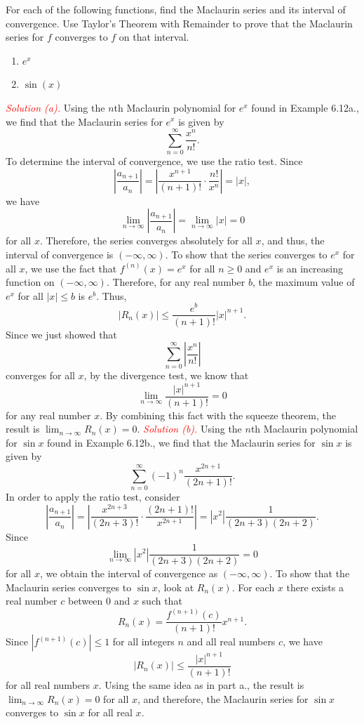 \documentclass{report}
\begin{document}
    \bigbreak \noindent 
    \begin{exm}
    For each of the following functions, find the Maclaurin series and its interval of convergence. Use Taylor’s Theorem with Remainder to prove that the Maclaurin series for  $f$ converges to  $f$ on that interval.    
    \begin{enumerate}[label=(\alph*)]
        \item $e^{x}$
        \item $\sin{(x)}$
    \end{enumerate}
    \end{exm}
    \bigbreak \noindent 
    \textcolor{red}{\textit{Solution (a).}}
    Using the $n$th Maclaurin polynomial for $e^x$ found in Example 6.12a., we find that the Maclaurin series for $e^x$ is given by
    \[
    \sum_{n=0}^{\infty} \frac{x^n}{n!}.
    \]
    To determine the interval of convergence, we use the ratio test. Since
    \[
    \left| \frac{a_{n+1}}{a_n} \right| = \left| \frac{x^{n+1}}{(n+1)!} \cdot \frac{n!}{x^n} \right| = |x|,
    \]
    we have
    \[
    \lim_{n \to \infty} \left| \frac{a_{n+1}}{a_n} \right| = \lim_{n \to \infty} |x| = 0
    \]
    for all $x$. Therefore, the series converges absolutely for all $x$, and thus, the interval of convergence is $(-\infty, \infty)$.
    To show that the series converges to $e^x$ for all $x$, we use the fact that $f^{(n)}(x) = e^x$ for all $n \geq 0$ and $e^x$ is an increasing function on $(-\infty, \infty)$. Therefore, for any real number $b$, the maximum value of $e^x$ for all $|x| \leq b$ is $e^b$. Thus,
    \[
    |R_n(x)| \leq \frac{e^b}{(n+1)!} |x|^{n+1}.
    \]
    Since we just showed that
    \[
    \sum_{n=0}^{\infty} \left| \frac{x^n}{n!} \right|
    \]
    converges for all $x$, by the divergence test, we know that
    \[
    \lim_{n \to \infty} \frac{|x|^{n+1}}{(n+1)!} = 0
    \]
    for any real number $x$. By combining this fact with the squeeze theorem, the result is $\lim_{n \to \infty} R_n(x) = 0$.
    \bigbreak \noindent 
    \textcolor{red}{\textit{Solution (b).}}
    Using the $n$th Maclaurin polynomial for $\sin x$ found in Example 6.12b., we find that the Maclaurin series for $\sin x$ is given by
    \[
    \sum_{n=0}^{\infty} (-1)^n \frac{x^{2n+1}}{(2n+1)!}.
    \]
    In order to apply the ratio test, consider
    \[
    \left| \frac{a_{n+1}}{a_n} \right| = \left| \frac{x^{2n+3}}{(2n+3)!} \cdot \frac{(2n+1)!}{x^{2n+1}} \right| = \left| x^2 \right| \frac{1}{(2n+3)(2n+2)}.
    \]
    Since
    \[
    \lim_{n \to \infty} \left| x^2 \right| \frac{1}{(2n+3)(2n+2)} = 0
    \]
    for all $x$, we obtain the interval of convergence as $(-\infty, \infty)$.
    To show that the Maclaurin series converges to $\sin x$, look at $R_n(x)$. For each $x$ there exists a real number $c$ between $0$ and $x$ such that
    \[
    R_n(x) = \frac{f^{(n+1)}(c)}{(n+1)!} x^{n+1}.
    \]
    Since $\left| f^{(n+1)}(c) \right| \leq 1$ for all integers $n$ and all real numbers $c$, we have
    \[
    \left| R_n(x) \right| \leq \frac{|x|^{n+1}}{(n+1)!}
    \]
    for all real numbers $x$. Using the same idea as in part a., the result is $\lim_{n \to \infty} R_n(x) = 0$ for all $x$, and therefore, the Maclaurin series for $\sin x$ converges to $\sin x$ for all real $x$.
\end{document}
